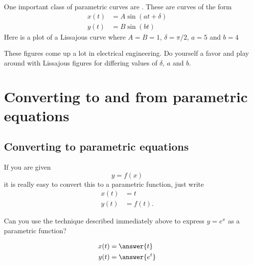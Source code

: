 \documentclass{ximera}
\begin{document}
One important class of parametric curves are . These are curves of the form
\begin{align*}
  x(t) &= A \sin(at + \delta)\\
  y(t) &= B\sin(bt)
\end{align*}
Here is a plot of a Lissajous curve where $A=B=1$, $\delta = \pi/2$,
$a=5$ and $b=4$
\begin{image}
\end{image}
These figures come up a lot in electrical engineering. Do yourself a
favor and play around with Lissajous figures for differing values of
$\delta$, $a$ and $b$.



\section{Converting to and from parametric equations}

\subsection{Converting to parametric equations}

If you are given
\[
y = f(x)
\]
it is really easy to convert this to a parametric function, just write
\begin{align*}
  x(t) &= t\\
  y(t) &= f(t).
\end{align*}

\begin{question}
  Can you use the technique described immediately above to express $y
  = e^x$ as a parametric function?
  \begin{prompt}
    \begin{align*}
      x(t) &= \answer{t}\\
      y(t) &= \answer{e^t}
    \end{align*}
  \end{prompt}
\end{question}
\end{document}
